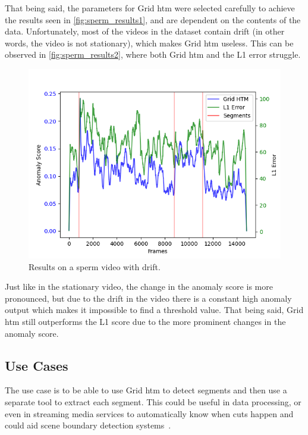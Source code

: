 \par
That being said, the parameters for Grid \gls*{htm} were selected carefully to achieve the results seen in \autoref{fig:sperm_results1}, and are dependent on the contents of the data. Unfortunately, most of the videos in the dataset contain drift (in other words, the video is not stationary), which makes Grid \gls*{htm} useless. This can be observed in \autoref{fig:sperm_results2}, where both Grid \gls*{htm} and the L1 error struggle.
\begin{figure}[H]
    \centering
    \includegraphics[width=\textwidth]{resources/experiments/sperm/sperm_result2.png}
    \caption[Drifting Video Results]{Results on a sperm video with drift.}
    \label{fig:sperm_results2}
\end{figure}
Just like in the stationary video, the change in the anomaly score is more pronounced, but due to the drift in the video there is a constant high anomaly output which makes it impossible to find a threshold value. That being said, Grid \gls*{htm} still outperforms the L1 score due to the more prominent changes in the anomaly score.
\subsection{Use Cases}
The use case is to be able to use Grid \gls*{htm} to detect segments and then use a separate tool to extract each segment. This could be useful in data processing, or even in streaming media services to automatically know when cuts happen and could aid scene boundary detection systems~\cite{scene_boundary_detection}.
